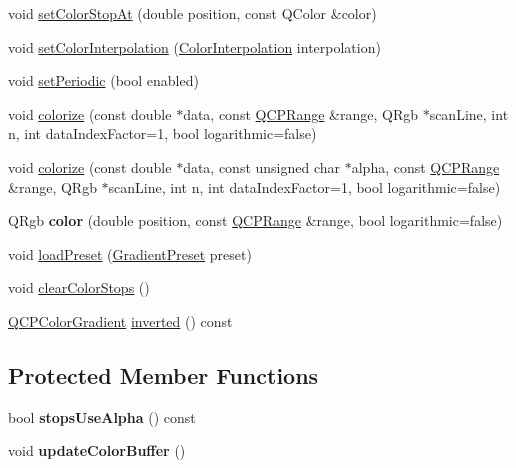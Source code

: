 \begin{DoxyCompactItemize}
\item 
void \hyperlink{class_q_c_p_color_gradient_a3b48be5e78079db1bb2a1188a4c3390e}{set\+Color\+Stop\+At} (double position, const Q\+Color \&color)
\item 
void \hyperlink{class_q_c_p_color_gradient_aa13fda86406e1d896a465a409ae63b38}{set\+Color\+Interpolation} (\hyperlink{class_q_c_p_color_gradient_ac5dca17cc24336e6ca176610e7f77fc1}{Color\+Interpolation} interpolation)
\item 
void \hyperlink{class_q_c_p_color_gradient_a39d6448155fc00a219f239220d14bb39}{set\+Periodic} (bool enabled)
\item 
void \hyperlink{class_q_c_p_color_gradient_aaf423ceb943e177b0ed2c48c811d83dc}{colorize} (const double $\ast$data, const \hyperlink{class_q_c_p_range}{Q\+C\+P\+Range} \&range, Q\+Rgb $\ast$scan\+Line, int n, int data\+Index\+Factor=1, bool logarithmic=false)
\item 
void \hyperlink{class_q_c_p_color_gradient_acf0cc7fba83ef21f7b8d5d5258519db3}{colorize} (const double $\ast$data, const unsigned char $\ast$alpha, const \hyperlink{class_q_c_p_range}{Q\+C\+P\+Range} \&range, Q\+Rgb $\ast$scan\+Line, int n, int data\+Index\+Factor=1, bool logarithmic=false)
\item 
\mbox{\label{class_q_c_p_color_gradient_a0599545c859268b025d2060dea741cea}} 
Q\+Rgb {\bfseries color} (double position, const \hyperlink{class_q_c_p_range}{Q\+C\+P\+Range} \&range, bool logarithmic=false)
\item 
void \hyperlink{class_q_c_p_color_gradient_aa0aeec1528241728b9671bf8e60b1622}{load\+Preset} (\hyperlink{class_q_c_p_color_gradient_aed6569828fee337023670272910c9072}{Gradient\+Preset} preset)
\item 
void \hyperlink{class_q_c_p_color_gradient_a939213e85f0d1279519d555c5fcfb6ad}{clear\+Color\+Stops} ()
\item 
\hyperlink{class_q_c_p_color_gradient}{Q\+C\+P\+Color\+Gradient} \hyperlink{class_q_c_p_color_gradient_a9f72f501de429829ec446333316decda}{inverted} () const
\end{DoxyCompactItemize}
\subsection*{Protected Member Functions}
\begin{DoxyCompactItemize}
\item 
\mbox{\label{class_q_c_p_color_gradient_a137b368ea8829a871974add6e4883c71}} 
bool {\bfseries stops\+Use\+Alpha} () const
\item 
\mbox{\label{class_q_c_p_color_gradient_a353f15ab3ab586eebf1f6b58c3e2707b}} 
void {\bfseries update\+Color\+Buffer} ()
\end{DoxyCompactItemize}
